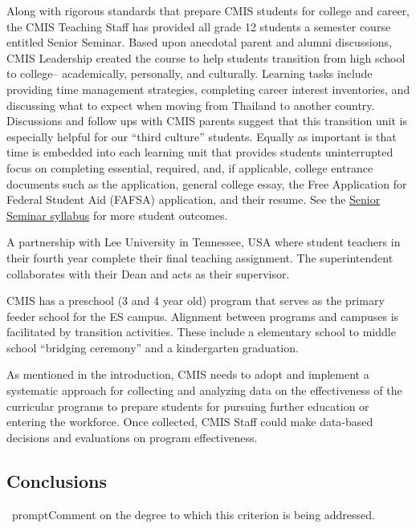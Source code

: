\begin{findings}
Along with rigorous standards that prepare CMIS students for college and career, the CMIS Teaching Staff has provided all grade 12 students a semester course entitled Senior Seminar. Based upon anecdotal parent and alumni discussions, CMIS Leadership created the course to help students transition from high school to college-- academically, personally, and culturally. Learning tasks include providing time management strategies, completing career interest inventories, and discussing what to expect when moving from Thailand to another country. Discussions and follow ups with CMIS parents suggest that this transition unit is especially helpful for our “third culture” students. Equally as important is that time is embedded into each learning unit that provides students uninterrupted focus on completing essential, required, and, if applicable, college entrance documents such as the application, general college essay, the Free Application for Federal Student Aid (FAFSA) application, and their resume. See the \href{https://docs.google.com/document/d/18kR5KtmfaH0cXUem7C2YUkeOWLfFMl_x3ekP-plvyRk/edit}{Senior Seminar syllabus} for more student outcomes. 


A partnership with Lee University in Tennessee, USA where student teachers in their fourth year complete their final teaching assignment. The superintendent collaborates with their Dean and acts as their supervisor.

CMIS has a preschool (3 and 4 year old) program that serves as the primary feeder school for the ES campus.  Alignment between programs and campuses is facilitated by transition activities. These include a elementary school to middle school “bridging ceremony” and a kindergarten graduation.


As mentioned in the introduction, CMIS needs to adopt and implement a systematic approach for collecting and analyzing data on the effectiveness of the curricular programs to prepare students for pursuing further education or entering the workforce. Once collected, CMIS Staff could make data-based decisions and evaluations on program effectiveness. 
\end{findings}

\subsection{Conclusions}
\
prompt{Comment on the degree to which this criterion is being addressed.}

